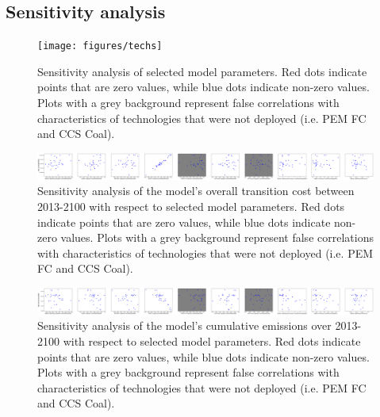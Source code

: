 \subsection{Sensitivity analysis}

\begin{figure}[h] 
\centering
\hspace*{-3cm}
\texttt{[image: figures/techs]}
\caption{Sensitivity analysis of selected model parameters. Red dots indicate points that are zero values, while blue dots indicate non-zero values. Plots with a grey background represent false correlations with characteristics of technologies that were not deployed (i.e. PEM FC and CCS Coal). }
\label{sa-techs}
\end{figure}

\begin{figure}[h] 
\centering
\hspace*{-3cm}
\includegraphics[scale=0.14]{figures/syscost}
\caption{Sensitivity analysis of the model's overall transition cost between 2013-2100 with respect to selected model parameters.  Red dots indicate points that are zero values, while blue dots indicate non-zero values. Plots with a grey background represent false correlations with characteristics of technologies that were not deployed (i.e. PEM FC and CCS Coal).}
\label{sa-syscost}
\end{figure}

\begin{figure}[h] 
\centering
\hspace*{-3cm}
\includegraphics[scale=0.14]{figures/co2emi}
\caption{Sensitivity analysis of the model's cumulative emissions over 2013-2100 with respect to selected model parameters. Red dots indicate points that are zero values, while blue dots indicate non-zero values. Plots with a grey background represent false correlations with characteristics of technologies that were not deployed (i.e. PEM FC and CCS Coal). }
\label{sa-co2}
\end{figure}

